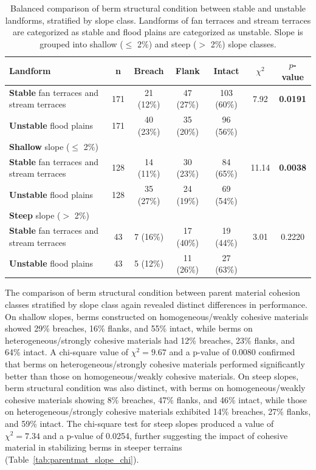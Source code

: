 \documentclass[review]{elsarticle}
\begin{document}
\begin{table}[h!]
\centering
\caption{\normalsize Balanced comparison of berm structural condition between stable and unstable landforms, stratified by slope class. Landforms of fan terraces and stream terraces are categorized as stable and flood plains are categorized as unstable. Slope is grouped into shallow ($\leq$ 2\%) and steep ($>$ 2\%) slope classes.}
\small
\begin{tabular}{|l|c|c|c|c|c|c|}
\hline
\textbf{Landform} & \textbf{n} & \textbf{Breach} & \textbf{Flank} & \textbf{Intact} & \textbf{$\chi^2$} & \textbf{$p$-value} \\
\hline
\textbf{Stable} fan terraces and stream terraces & 171 & 21 (12\%) & 47 (27\%) & 103 (60\%) & 7.92 & \textbf{0.0191} \\
\hline
\textbf{Unstable} flood plains & 171 & 40 (23\%) & 35 (20\%) & 96 (56\%) & & \\
\hline
\hline
\textbf{Shallow} slope ($\leq$ 2\%) & & & & & & \\
\hline
\textbf{Stable} fan terraces and stream terraces & 128 & 14 (11\%) & 30 (23\%) & 84 (65\%) & 11.14 & \textbf{0.0038} \\
\hline
\textbf{Unstable} flood plains & 128 & 35 (27\%) & 24 (19\%) & 69 (54\%) & & \\
\hline
\hline
\textbf{Steep} slope ($>$ 2\%) & & & & & & \\
\hline
\textbf{Stable} fan terraces and stream terraces & 43 & 7 (16\%) & 17 (40\%) & 19 (44\%) & 3.01 & 0.2220 \\
\hline
\textbf{Unstable} flood plains & 43 & 5 (12\%) & 11 (26\%) & 27 (63\%) & & \\
\hline
\end{tabular}
\label{tab:stability_slope_chi}
\end{table}

The comparison of berm structural condition between parent material cohesion classes stratified by slope class again revealed distinct differences in performance. On shallow slopes, berms constructed on homogeneous/weakly cohesive materials showed 29\% breaches, 16\% flanks, and 55\% intact, while berms on heterogeneous/strongly cohesive materials had 12\% breaches, 23\% flanks, and 64\% intact. A chi-square value of $\chi^2 = 9.67$ and a p-value of 0.0080 confirmed that berms on heterogeneous/strongly cohesive materials performed significantly better than those on homogeneous/weakly cohesive materials. On steep slopes, berm structural condition was also distinct, with berms on homogeneous/weakly cohesive materials showing 8\% breaches, 47\% flanks, and 46\% intact, while those on heterogeneous/strongly cohesive materials exhibited 14\% breaches, 27\% flanks, and 59\% intact. The chi-square test for steep slopes produced a value of $\chi^2 = 7.34$ and a p-value of 0.0254, further suggesting the impact of cohesive material in stabilizing berms in steeper terrains (Table~\ref{tab:parentmat_slope_chi}).
\end{document}
